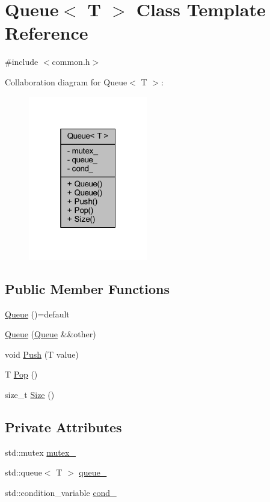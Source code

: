 \hypertarget{class_queue}{}\section{Queue$<$ T $>$ Class Template Reference}
\label{class_queue}


{\ttfamily \#include $<$common.\+h$>$}



Collaboration diagram for Queue$<$ T $>$\+:\nopagebreak
\begin{figure}[H]
\begin{center}
\leavevmode
\includegraphics[width=148pt]{class_queue__coll__graph}
\end{center}
\end{figure}
\subsection*{Public Member Functions}
\begin{DoxyCompactItemize}
\item 
\mbox{\hyperlink{class_queue_ae6722c0f5afecd83719909a24f4902eb}{Queue}} ()=default
\item 
\mbox{\hyperlink{class_queue_ae486d20f8e29eefa34cf955904a44110}{Queue}} (\mbox{\hyperlink{class_queue}{Queue}} \&\&other)
\item 
void \mbox{\hyperlink{class_queue_ace62235edaffc6f375d040c32c0ab651}{Push}} (T value)
\item 
T \mbox{\hyperlink{class_queue_a5897608241a6c919354cdc1a1815c0ae}{Pop}} ()
\item 
size\+\_\+t \mbox{\hyperlink{class_queue_a5e59f2b97d5dea8ad0314b6239816055}{Size}} ()
\end{DoxyCompactItemize}
\subsection*{Private Attributes}
\begin{DoxyCompactItemize}
\item 
std\+::mutex \mbox{\hyperlink{class_queue_ad341bfdf4d075ed6ab4807da10e703cd}{mutex\+\_\+}}
\item 
std\+::queue$<$ T $>$ \mbox{\hyperlink{class_queue_a60e7a5aba900b055cd0668755c0dfadd}{queue\+\_\+}}
\item 
std\+::condition\+\_\+variable \mbox{\hyperlink{class_queue_aeb109ed25687457524a70b03a2584b6d}{cond\+\_\+}}
\end{DoxyCompactItemize}


